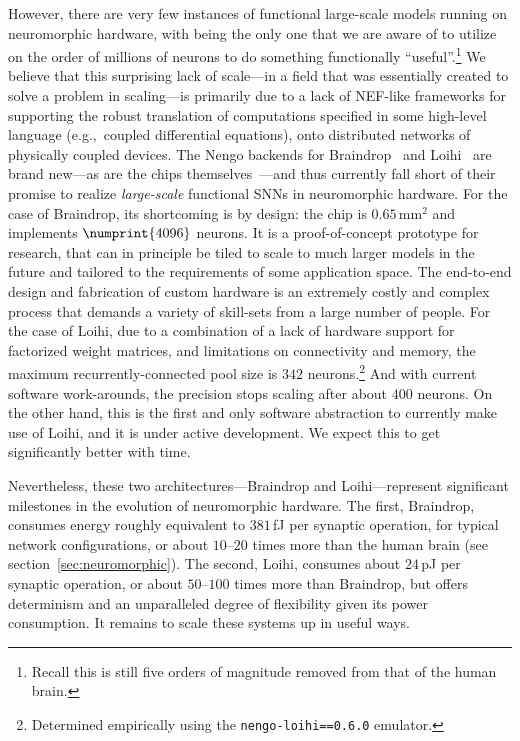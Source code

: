However, there are very few instances of functional large-scale models running on neuromorphic hardware, with \citet{mundy2016real} being the only one that we are aware of to utilize on the order of millions of neurons to do something functionally ``useful''.\footnote{%
Recall this is still five orders of magnitude removed from that of the human brain.}
We believe that this surprising lack of scale---in a field that was essentially created to solve a problem in scaling---is primarily due to a lack of NEF-like frameworks for supporting the robust translation of computations specified in some high-level language (e.g.,~coupled differential equations), onto distributed networks of physically coupled devices.
The Nengo backends for Braindrop~\citep{braindrop2019} and Loihi~\citep{nengoloihi} are brand new---as are the chips themselves~\citep{neckar2018braindrop, davies2018loihi}---and thus currently fall short of their promise to realize \emph{large-scale} functional SNNs in neuromorphic hardware.
For the case of Braindrop, its shortcoming is by design: the chip is $0.65$\,mm${}^2$ and implements $\numprint{4096}$ neurons.
It is a proof-of-concept prototype for research, that can in principle be tiled to scale to much larger models in the future and tailored to the requirements of some application space.
The end-to-end design and fabrication of custom hardware is an extremely costly and complex process that demands a variety of skill-sets from a large number of people.
For the case of Loihi, due to a combination of a lack of hardware support for factorized weight matrices, and limitations on connectivity and memory, the maximum recurrently-connected pool size is $342$ neurons.\footnote{Determined empirically using the \texttt{nengo-loihi==0.6.0} emulator.}
And with current software work-arounds, the precision stops scaling after about $400$ neurons.
On the other hand, this is the first and only software abstraction to currently make use of Loihi, and it is under active development.
We expect this to get significantly better with time.

Nevertheless, these two architectures---Braindrop and Loihi---represent significant milestones in the evolution of neuromorphic hardware.
The first, Braindrop, consumes energy roughly equivalent to $381$\,fJ per synaptic operation, for typical network configurations, or about $10$--$20$ times more than the human brain (see section~\ref{sec:neuromorphic}).
The second, Loihi, consumes about $24$\,pJ per synaptic operation, or about $50$--$100$ times more than Braindrop, but offers determinism and an unparalleled degree of flexibility given its power consumption.
It remains to scale these systems up in useful ways.

